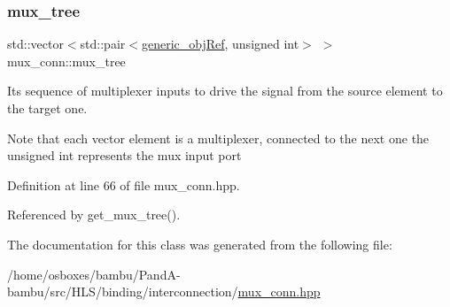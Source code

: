 \subsubsection{\texorpdfstring{mux\+\_\+tree}{mux\_tree}}
{\footnotesize\ttfamily std\+::vector$<$std\+::pair$<$\hyperlink{generic__obj_8hpp_acb533b2ef8e0fe72e09a04d20904ca81}{generic\+\_\+obj\+Ref}, unsigned int$>$ $>$ mux\+\_\+conn\+::mux\+\_\+tree\hspace{0.3cm}{\ttfamily [private]}}



It\textquotesingle{}s sequence of multiplexer inputs to drive the signal from the source element to the target one. 

Note that each vector element is a multiplexer, connected to the next one the unsigned int represents the mux input port 

Definition at line 66 of file mux\+\_\+conn.\+hpp.



Referenced by get\+\_\+mux\+\_\+tree().



The documentation for this class was generated from the following file\+:\begin{DoxyCompactItemize}
\item 
/home/osboxes/bambu/\+Pand\+A-\/bambu/src/\+H\+L\+S/binding/interconnection/\hyperlink{mux__conn_8hpp}{mux\+\_\+conn.\+hpp}\end{DoxyCompactItemize}

